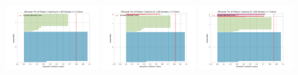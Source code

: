 \documentclass[10pt, a4paper]{article}
\begin{document}
    	\begin{figure}[H]
    		\centering
    		
    		\includegraphics[width = 3.5cm]{silhouette_visualization_2.png}
    		\includegraphics[width = 3.5cm]{silhouette_visualization_3.png}
    		\includegraphics[width = 3.5cm]{silhouette_visualization_4.png}
   		\end{figure}
   		
\end{document}
